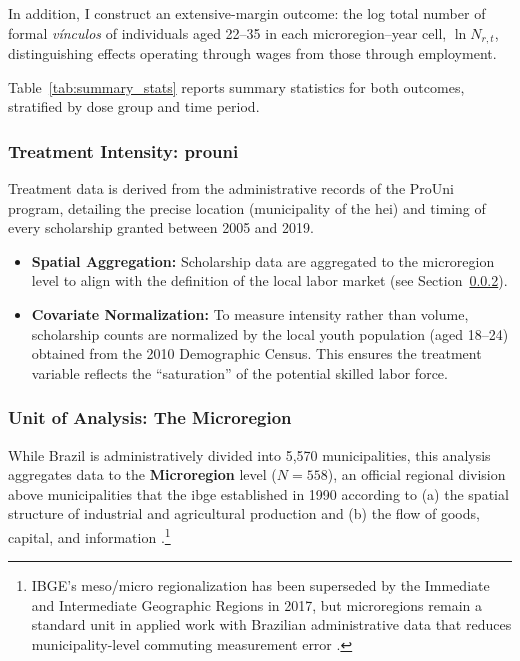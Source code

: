 In addition, I construct an extensive-margin outcome: the log total number of formal \emph{vínculos} of individuals aged 22--35 in each microregion--year cell, $\ln N_{r,t}$, distinguishing effects operating through wages from those through employment.

Table~\ref{tab:summary_stats} reports summary statistics for both outcomes, stratified by dose group and time period.

\subsubsection{Treatment Intensity: \acrshort{prouni}}
Treatment data is derived from the administrative records of the ProUni program, detailing the precise location (municipality of the \acrshort{hei}) and timing of every scholarship granted between 2005 and 2019.
\begin{itemize}
    \item \textbf{Spatial Aggregation:} Scholarship data are aggregated to the microregion level to align with the definition of the local labor market (see Section~\ref{sec:unit_analysis}).
    \item \textbf{Covariate Normalization:} To measure intensity rather than volume, scholarship counts are normalized by the local youth population (aged 18--24) obtained from the 2010 Demographic Census. This ensures the treatment variable reflects the ``saturation'' of the potential skilled labor force.
\end{itemize}

\subsubsection{Unit of Analysis: The Microregion}
\label{sec:unit_analysis}

While Brazil is administratively divided into 5,570 municipalities, this analysis aggregates data to the \textbf{Microregion} level ($N = 558$), an official regional division above municipalities that the \acrshort{ibge} established in 1990 according to (a) the spatial structure of industrial and agricultural production and (b) the flow of goods, capital, and information \cite{IBGE_QGR_2022}.\footnote{IBGE's meso/micro regionalization has been superseded by the Immediate and Intermediate Geographic Regions in 2017, but microregions remain a standard unit in applied work with Brazilian administrative data that reduces municipality-level commuting measurement error \cite{IBGE_QGR_2022}.}

